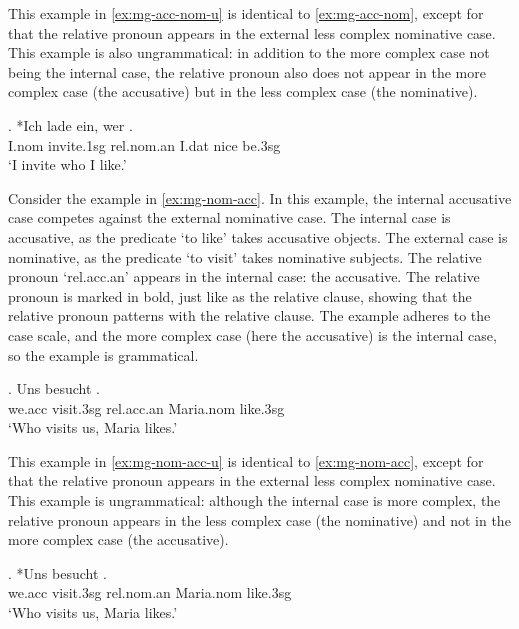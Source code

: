 This example in \ref{ex:mg-acc-nom-u} is identical to \ref{ex:mg-acc-nom}, except for that the relative pronoun appears in the external less complex nominative case. This example is also ungrammatical: in addition to the more complex case not being the internal case, the relative pronoun also does not appear in the more complex case (the accusative) but in the less complex case (the nominative).

\exg. *Ich {lade ein}, wer   .\\
I.\ac{nom} invite.1\ac{sg}\scsub{[acc]} \ac{rel}.\ac{nom}.\ac{an} I.\ac{dat} nice be.3\ac{sg}\scsub{[nom]}\\
`I invite who I like.' \label{ex:mg-acc-nom-u}

Consider the example in \ref{ex:mg-nom-acc}. In this example, the internal accusative case competes against the external nominative case.
The internal case is accusative, as the predicate  `to like' takes accusative objects.
The external case is nominative, as the predicate  `to visit' takes nominative subjects.
The relative pronoun  `\ac{rel}.\ac{acc}.\ac{an}' appears in the internal case: the accusative. The relative pronoun is marked in bold, just like as the relative clause, showing that the relative pronoun patterns with the relative clause.
The example adheres to the case scale, and the more complex case (here the accusative) is the internal case, so the example is grammatical.

\exg. Uns besucht   .\\
 we.\ac{acc} visit.3\ac{sg}\scsub{[nom]} \ac{rel}.\ac{acc}.\ac{an} Maria.\ac{nom} like.3\ac{sg}\scsub{[acc]}\\
 `Who visits us, Maria likes.' \label{ex:mg-nom-acc}

This example in \ref{ex:mg-nom-acc-u} is identical to \ref{ex:mg-nom-acc}, except for that the relative pronoun appears in the external less complex nominative case. This example is ungrammatical: although the internal case is more complex, the relative pronoun appears in the less complex case (the nominative) and not in the more complex case (the accusative).

\exg. *Uns besucht   .\\
 we.\ac{acc} visit.3\ac{sg}\scsub{[nom]} \ac{rel}.\ac{nom}.\ac{an} Maria.\ac{nom} like.3\ac{sg}\scsub{[acc]}\\
 `Who visits us, Maria likes.' \label{ex:mg-nom-acc-u}

